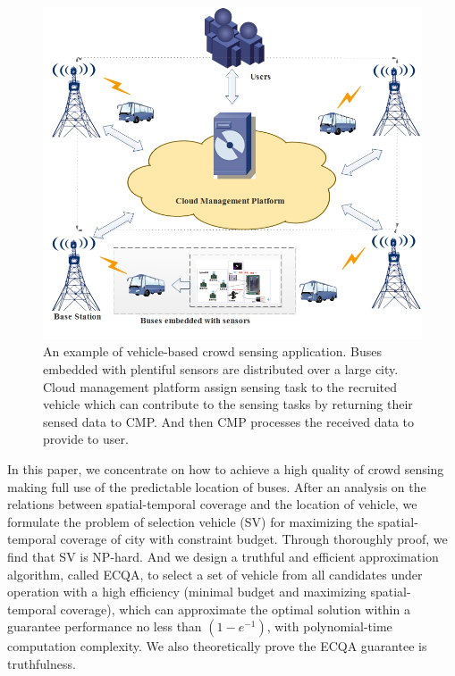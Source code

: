 \documentclass[journal]{IEEEtran}
\begin{document}
\begin{figure}[t]
	\centering
	\includegraphics[width=1.0\linewidth]{Figure1.png}
	\caption[Fig.1]{An example of vehicle-based crowd sensing application. Buses embedded with plentiful sensors are distributed over a large city. Cloud management platform assign sensing task to the recruited vehicle which can contribute to the sensing tasks by returning their sensed data to CMP. And then CMP processes the received data to provide to user.}
	\label{Figure1}
\end{figure}

In this paper, we concentrate on how to achieve a high quality of crowd sensing making full use of the predictable location of buses. After an analysis on the relations between spatial-temporal coverage and the location of vehicle, we formulate the problem of selection vehicle (SV) for maximizing the spatial-temporal coverage of city with constraint budget. Through thoroughly proof, we find that SV is NP-hard. And we design a truthful and efficient approximation algorithm, called ECQA, to select a set of vehicle from all candidates under operation with a high efficiency (minimal budget and maximizing spatial-temporal coverage), which can approximate the optimal solution within a guarantee performance no less than $\left ( 1-e^{-1} \right )$, with polynomial-time computation complexity. We also theoretically prove the ECQA guarantee is truthfulness.
\end{document}
